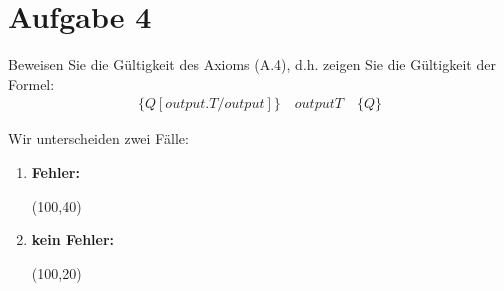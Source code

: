 \documentclass[ngerman,a4paper]{report}
\begin{document}
\section*{Aufgabe 4}
Beweisen Sie die Gültigkeit des Axioms (A.4), d.h. zeigen Sie die Gültigkeit der Formel:
\begin{align*}
\{Q[output.T/output]\}\quad
output T\quad
\{Q\}
\end{align*}

Wir unterscheiden zwei Fälle:
\begin{enumerate}
	\item \textbf{Fehler:}\\
\begin{struktogramm}(100,40)
\end{struktogramm}
\item \textbf{kein Fehler:}\\
\begin{struktogramm}(100,20)
\end{struktogramm}
\end{enumerate}
\end{document}
